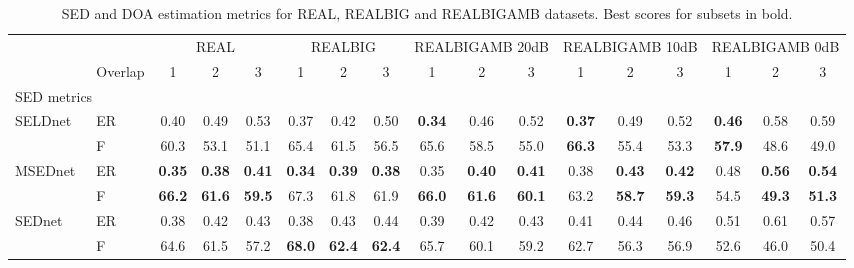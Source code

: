 \documentclass[journal]{IEEEtran}
\begin{document}

\begin{table*}[!htb]
\centering
\caption{SED and DOA estimation metrics for REAL, REALBIG and REALBIGAMB datasets. Best scores for subsets in bold.}
\label{T:real_score}
\begin{tabular}{l|l|ccc|ccc|ccc|ccc|ccc|}
\multicolumn{2}{c|}{} & \multicolumn{3}{c|}{REAL} & \multicolumn{3}{c|}{REALBIG} & \multicolumn{3}{c|}{REALBIGAMB 20dB} & \multicolumn{3}{c|}{REALBIGAMB 10dB} & \multicolumn{3}{c|}{REALBIGAMB 0dB} \\ \cline{3-17}
\multicolumn{1}{c|}{} &Overlap & 1 & 2 & 3 & 1 & 2 & 3 & 1 & 2 & 3 & 1 & 2 & 3 & 1 & 2 & 3 \\ \cline{2-17}
%
%
\multicolumn{17}{l}{SED metrics} \\ \hline
SELDnet & ER & 0.40 & 0.49 & 0.53 & 0.37 & 0.42 & 0.50 & \bf0.34 & 0.46 & 0.52 &\bf 0.37 & 0.49 & 0.52 & \bf0.46 & 0.58 & 0.59 \\
 & F & 60.3 & 53.1 & 51.1 & 65.4 & 61.5 & 56.5 & 65.6 & 58.5 & 55.0 & \bf66.3 & 55.4 & 53.3 &\bf 57.9 & 48.6 & 49.0 \\\cline{2-17}
MSEDnet~\cite{Adavanne2017} & ER & \bf 0.35 & \bf0.38 & \bf0.41 &\bf 0.34 &\bf 0.39 &\bf 0.38 & 0.35 & \bf0.40 & \bf0.41 & 0.38 & \bf0.43 & \bf0.42 & 0.48 & \bf0.56 & \bf0.54 \\ 
 & F & \bf66.2 & \bf61.6 & \bf59.5 & 67.3 & 61.8 & 61.9 & \bf66.0 & \bf61.6 & \bf60.1 & 63.2 & \bf58.7 & \bf59.3 & 54.5 & \bf49.3 & \bf51.3 \\\cline{2-17}
SEDnet~\cite{Adavanne2017} & ER & 0.38 & 0.42 & 0.43 & 0.38 & 0.43 & 0.44 & 0.39 & 0.42 & 0.43 & 0.41 & 0.44 & 0.46 & 0.51 & 0.61 & 0.57 \\
 & F & 64.6 & 61.5 & 57.2 & \bf68.0 & \bf62.4 & \bf62.4 & 65.7 & 60.1 & 59.2 & 62.7 & 56.3 & 56.9 & 52.6 & 46.0 & 50.4 \\

\end{tabular}
\end{table*}
\end{document}
